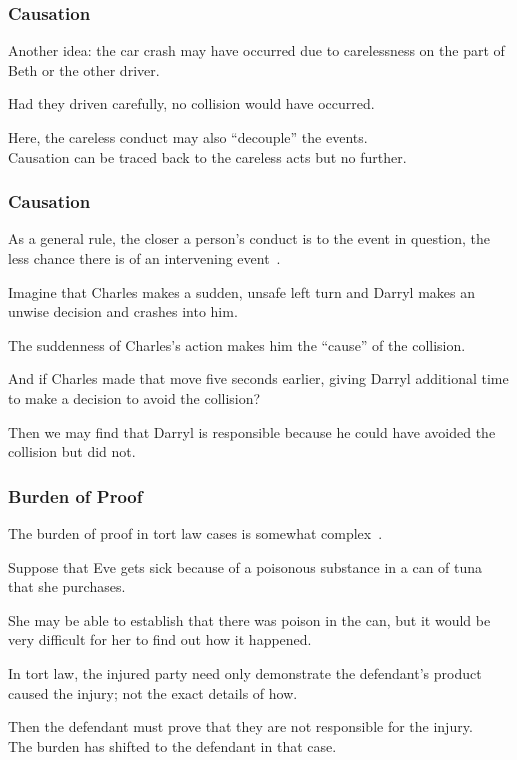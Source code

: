 \begin{frame}
\frametitle{Causation}

Another idea: the car crash may have occurred due to carelessness on the part of Beth or the other driver.

Had they driven carefully, no collision would have occurred.

Here, the careless conduct may also ``decouple'' the events.\\
\quad Causation can be traced back to the careless acts but no further.

\end{frame}



\begin{frame}
\frametitle{Causation}

As a general rule, the closer a person's conduct is to the event in question, the less chance there is of an intervening event~\cite{lba}.

Imagine that Charles makes a sudden, unsafe left turn and Darryl makes an unwise decision and crashes into him. 

The suddenness of Charles's action makes him the ``cause'' of the collision. 

And if Charles made that move five seconds earlier, giving Darryl additional time to make a decision to avoid the collision? 

Then we may find that Darryl is responsible because he could have avoided the collision but did not.

\end{frame}



\begin{frame}
\frametitle{Burden of Proof}

The burden of proof in tort law cases is somewhat complex~\cite{lba}.

Suppose that Eve gets sick because of a poisonous substance in a can of tuna that she purchases.

She may be able to establish that there was poison in the can, but it would be very difficult for her to find out how it happened.

In tort law, the injured party need only demonstrate the defendant's product caused the injury; not the exact details of how.

Then the defendant must prove that they are not responsible for the injury.\\
\quad The burden has shifted to the defendant in that case.


\end{frame}



